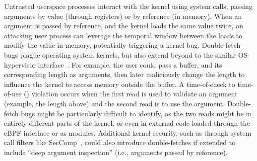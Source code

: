 Untrusted userspace processes interact with the kernel using system calls,
passing arguments by value (through registers) or by reference (in memory).
When an argument is passed by reference, and the kernel loads the same
value twice, an attacking user process can leverage the temporal window 
between the loads to modify the value in memory, potentially triggering a
kernel bug.
Double-fetch bugs plague operating system kernels, but also extend beyond
to the similar OS-hypervisor interface~\cite{cve201812633, cve202012652, 
cve20131332, cve201920610,cve20158550, cve201610439, cve201610435, 
cve201610433, cve20195519,cve20168438}.
For example, the user could pass a buffer, and its corresponding length
as arguments, then later maliciously change the length to influence the
kernel to access memory outside the buffer.
A time-of-check to time-of-use (\tocttou) violation occurs when the
first read is used to validate an argument (example, the length above)
and the second read is to use the argument.
Double-fetch bugs might be particularly difficult to identify, as the two
reads might be in entirely different parts of the kernel, or even in external
code loaded through the eBPF interface or as modules.
Additional kernel security, such as through system call filters like 
SecComp~\cite{seccomp}, could also introduce double-fetches if extended to
include ``deep argument inspection'' (i.e., arguments passed by reference).

